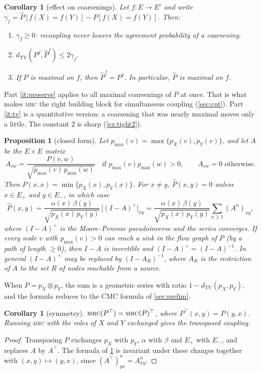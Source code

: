 \documentclass[11pt]{article}
\newtheorem{proposition}[theorem]{Proposition}
\newtheorem{corollary}[theorem]{Corollary}
\theoremstyle{definition}
\newcommand{\pX}{p_X}
\newcommand{\pY}{p_Y}
\newcommand{\hP}{\hat P}
\newcommand{\TV}{d_{\mathrm{TV}}}
\newcommand{\pmax}{p_{\max}}
\newcommand{\Ep}{E_{+}}
\newcommand{\Em}{E_{-}}
\newcommand{\MRC}{\textnormal{\textsc{mrc}}}
\begin{document}
\begin{corollary}[effect on coarsenings]\label{cor:coarsen}
Let $f\colon E\to E'$ and write $\gamma_f=\hP[f(X)=f(Y)]-P[f(X)=f(Y)]$. Then:
\begin{enumerate}[label=(\roman*)]
  \item\label{it:gain} $\gamma_f\ge 0$: recoupling never lowers the agreement probability of a coarsening.
  \item\label{it:tv} $\TV(P^f,\hP^f)\le 2\gamma_f$.
  \item\label{it:preserve} If $P$ is maximal on $f$, then $\hP^f=P^f$. In particular, $\hP$ is maximal on $f$.
\end{enumerate}
\end{corollary}

Part \ref{it:preserve} applies to all maximal coarsenings of $P$ at once. That
is what makes \MRC{} the right building block for simultaneous coupling
(\cref{sec:cpt}). Part \ref{it:tv} is a quantitative version: a coarsening that
was nearly maximal moves only a little. The constant $2$ is sharp
(\cref{ex:tight2}).

\begin{proposition}[closed form]\label{prop:closed-form}
Let $\pmax(v)=\max\{\pX(v),\pY(v)\}$, and let $A$ be the $E\times E$ matrix
\[
  A_{vw}=\frac{P(v,w)}{\sqrt{\pmax(v)\,\pmax(w)}}\quad\text{if }\pmax(v)\pmax(w)>0,
  \qquad A_{vw}=0\text{ otherwise}.
\]
Then $\hP(x,x)=\min\{\pX(x),\pY(x)\}$. For $x\neq y$, $\hP(x,y)=0$ unless
$x\in\Ep$ and $y\in\Em$, in which case
\[
  \hP(x,y)=\frac{\alpha(x)\,\beta(y)}{\sqrt{\pX(x)\,\pY(y)}}\,\bigl[(I-A)^{+}\bigr]_{xy}
          =\frac{\alpha(x)\,\beta(y)}{\sqrt{\pX(x)\,\pY(y)}}\sum_{n\ge1}(A^n)_{xy},
\]
where $(I-A)^{+}$ is the Moore--Penrose pseudoinverse and the series converges.
If every node $v$ with $\pmax(v)>0$ can reach a sink in the flow graph of $P$
(by a path of length $\ge0$), then $I-A$ is invertible and $(I-A)^+=(I-A)^{-1}$. In general $(I-A)^{+}$ may be replaced by
$(I-A_R)^{-1}$, where $A_R$ is the restriction of $A$ to the set $R$ of nodes
reachable from a source.
\end{proposition}

When $P=\pX\otimes\pY$, the sum is a geometric series with ratio
$1-\TV(\pX,\pY)$, and the formula reduces to the CMC formula of
\cref{sec:prelim}.

\begin{corollary}[symmetry]\label{cor:symmetry}
$\MRC(P^{\top})=\MRC(P)^{\top}$, where $P^\top(x,y)=P(y,x)$. Running \MRC{} with
the roles of $X$ and $Y$ exchanged gives the transposed coupling.
\end{corollary}
\begin{proof}
Transposing $P$ exchanges $\pX$ with $\pY$, $\alpha$ with $\beta$ and $\Ep$ with
$\Em$, and replaces $A$ by $A^{\top}$. The formula of \cref{prop:closed-form} is
invariant under these changes together with $(x,y)\mapsto(y,x)$, since
$(A^\top)^n_{yx}=A^n_{xy}$.
\end{proof}
\end{document}
